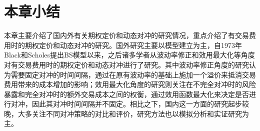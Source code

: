 \section{本章小结}

本章主要介绍了国内外有关期权定价和动态对冲的研究情况，重点介绍了有交易费用时的期权定价和动态对冲的研究。国外研究主要以模型建立为主，自1973年Black和Scholes提出BS模型以来，之后诸多学者从波动率修正和效用最大化等角度对有交易费用时的期权定价和动态对冲进行了研究。其中波动率修正角度的研究认为需要固定对冲的时间间隔，通过在原有波动率的基础上施加一个溢价来抵消交易费用带来的成本增加的影响；效用最大化角度的研究则关注在不完全对冲时的风险暴露和完全对冲时的额外交易成本之间的权衡，通过效用函数最大化来决定是否进行对冲，因此其对冲时间间隔并不固定。相比之下，国内这一方面的研究起步较晚，大多关注不同对冲策略的对比和评价，研究方法也以模拟分析和实证研究为主。
